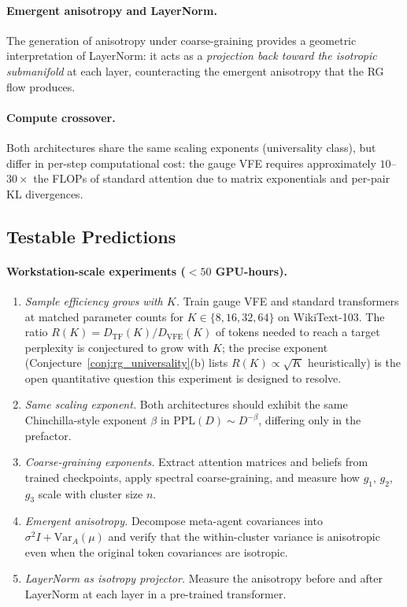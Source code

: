 \documentclass[twoside,11pt]{article}
\begin{document}
\paragraph{Emergent anisotropy and LayerNorm.}
The generation of anisotropy under coarse-graining provides a geometric interpretation of LayerNorm: it acts as a \emph{projection back toward the isotropic submanifold} at each layer, counteracting the emergent anisotropy that the RG flow produces.

\paragraph{Compute crossover.}
Both architectures share the same scaling exponents (universality class), but differ in per-step computational cost: the gauge VFE requires approximately $10$--$30\times$ the FLOPs of standard attention due to matrix exponentials and per-pair KL divergences.

\subsection{Testable Predictions}

\paragraph{Workstation-scale experiments ($<50$ GPU-hours).}
\begin{enumerate}
\item \emph{Sample efficiency grows with $K$.} Train gauge VFE and standard transformers at matched parameter counts for $K \in \{8, 16, 32, 64\}$ on WikiText-103. The ratio $R(K) = D_{\mathrm{TF}}(K) / D_{\mathrm{VFE}}(K)$ of tokens needed to reach a target perplexity is conjectured to grow with $K$; the precise exponent (Conjecture~\ref{conj:rg_universality}(b) lists $R(K) \propto \sqrt{K}$ heuristically) is the open quantitative question this experiment is designed to resolve.
\item \emph{Same scaling exponent.} Both architectures should exhibit the same Chinchilla-style exponent $\beta$ in $\mathrm{PPL}(D) \sim D^{-\beta}$, differing only in the prefactor.
\item \emph{Coarse-graining exponents.} Extract attention matrices and beliefs from trained checkpoints, apply spectral coarse-graining, and measure how $g_1$, $g_2$, $g_3$ scale with cluster size $n$.
\item \emph{Emergent anisotropy.} Decompose meta-agent covariances into $\sigma^2 I + \mathrm{Var}_A(\mu)$ and verify that the within-cluster variance is anisotropic even when the original token covariances are isotropic.
\item \emph{LayerNorm as isotropy projector.} Measure the anisotropy before and after LayerNorm at each layer in a pre-trained transformer.
\end{enumerate}
\end{document}
